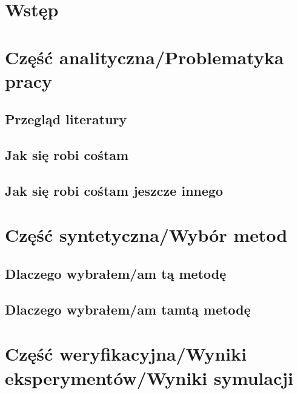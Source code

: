 

\graphicspath{{Images/}}


\tableofcontents
\thispagestyle{empty}
\thesisstyle
\newpage 

\section[Wstęp]{Wstęp}
\lipsum[1-5]

\section[Część analityczna]{Część analityczna/Problematyka pracy}
\subsection{Przegląd literatury}
\lipsum[1-3]
\subsection{Jak się robi cośtam}
\lipsum[1-3]
\subsection{Jak się robi cośtam jeszcze innego}
\lipsum[1-2]

\newpage
\section[Część syntetyczna]{Część syntetyczna/Wybór metod}
\subsection{Dlaczego wybrałem/am tą metodę}
\lipsum[1-3]
\subsection{Dlaczego wybrałem/am tamtą metodę}
\lipsum[1-3]

\newpage
\section[Część weryfikacyjna]{Część weryfikacyjna/Wyniki eksperymentów/Wyniki symulacji}
